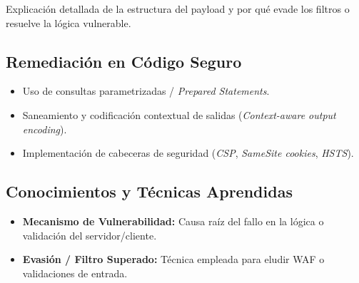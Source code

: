 \documentclass[../../../main_compilation.tex]{subfiles}
\begin{document}
\begin{notebox}
	Explicación detallada de la estructura del payload y por qué evade los filtros o resuelve la lógica vulnerable.
\end{notebox}

\subsection{Remediación en Código Seguro}

\begin{mitigationbox}
	\begin{itemize}[leftmargin=*]
		\item Uso de consultas parametrizadas / \textit{Prepared Statements}.
		\item Saneamiento y codificación contextual de salidas (\textit{Context-aware output encoding}).
		\item Implementación de cabeceras de seguridad (\textit{CSP}, \textit{SameSite cookies}, \textit{HSTS}).
	\end{itemize}
\end{mitigationbox}

\subsection{Conocimientos y Técnicas Aprendidas}

\begin{learningbox}
	\begin{itemize}[leftmargin=*]
		\item \textbf{Mecanismo de Vulnerabilidad:} Causa raíz del fallo en la lógica o validación del servidor/cliente.
		\item \textbf{Evasión / Filtro Superado:} Técnica empleada para eludir WAF o validaciones de entrada.
	\end{itemize}
\end{learningbox}

\begin{sourcebox}
	\begin{itemize}[leftmargin=*]
	\end{itemize}
\end{sourcebox}
\end{document}
